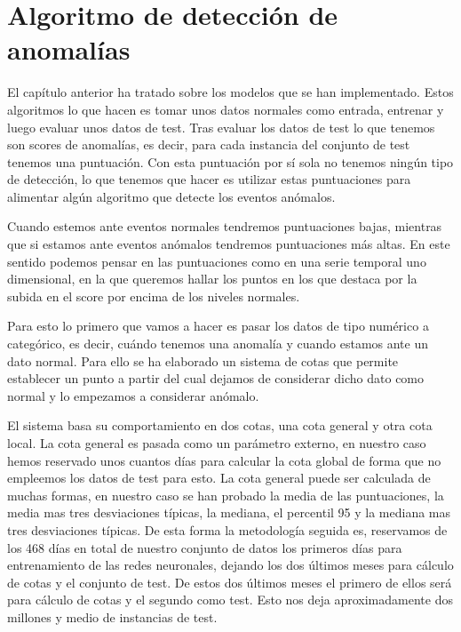 \chapter{Algoritmo de detección de anomalías}
\label{chapter:algoritmo-anomalias}

El capítulo anterior ha tratado sobre los modelos que se han implementado. Estos algoritmos lo que hacen es tomar unos datos normales como entrada, entrenar y luego evaluar unos datos de test. Tras evaluar los datos de test lo que tenemos son scores de anomalías, es decir, para cada instancia del conjunto de test tenemos una puntuación. Con esta puntuación por sí sola no tenemos ningún tipo de detección, lo que tenemos que hacer es utilizar estas puntuaciones para alimentar algún algoritmo que detecte los eventos anómalos.

Cuando estemos ante eventos normales tendremos puntuaciones bajas, mientras que si estamos ante eventos anómalos tendremos puntuaciones más altas. En este sentido podemos pensar en las puntuaciones como en una serie temporal uno dimensional, en la que queremos hallar los puntos en los que destaca por la subida en el score por encima de los niveles normales.

Para esto lo primero que vamos a hacer es pasar los datos de tipo numérico a categórico, es decir, cuándo tenemos una anomalía y cuando estamos ante un dato normal. Para ello se ha elaborado un sistema de cotas que permite establecer un punto a partir del cual dejamos de considerar dicho dato como normal y lo empezamos a considerar anómalo.

El sistema basa su comportamiento en dos cotas, una cota general y otra cota local. La cota general es pasada como un parámetro externo, en nuestro caso hemos reservado unos cuantos días para calcular la cota global de forma que no empleemos los datos de test para esto. La cota general puede ser calculada de muchas formas, en nuestro caso se han probado la media de las puntuaciones, la media mas tres desviaciones típicas, la mediana, el percentil 95 y la mediana mas tres desviaciones típicas. De esta forma la metodología seguida es, reservamos de los 468 días en total de nuestro conjunto de datos los primeros días para entrenamiento de las redes neuronales, dejando los dos últimos meses para cálculo de cotas y el conjunto de test. De estos dos últimos meses el primero de ellos será para cálculo de cotas y el segundo como test. Esto nos deja aproximadamente dos millones y medio de instancias de test.

